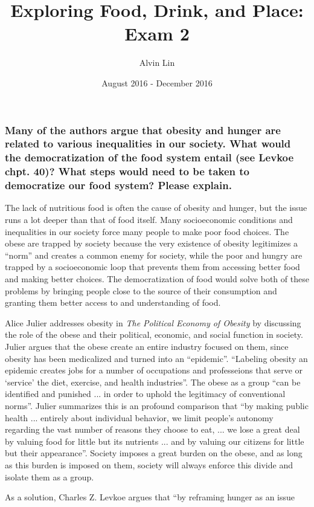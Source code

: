 \documentclass[letterpaper, 12pt]{article}
\title{Exploring Food, Drink, and Place: Exam 2}
\author{Alvin Lin}
\date{August 2016 - December 2016}
\begin{document}
\maketitle

\subsubsection*{Many of the authors argue that obesity and hunger are related
to various inequalities in our society. What would the democratization of the
food system entail (see Levkoe chpt. 40)? What steps would need to be taken to
democratize our food system? Please explain.}
The lack of nutritious food is often the cause of obesity and hunger, but the
issue runs a lot deeper than that of food itself. Many socioeconomic conditions
and inequalities in our society force many people to make poor food choices.
The obese are trapped by society because the very existence of obesity
legitimizes a ``norm'' and creates a common enemy for society, while the poor
and hungry are trapped by a socioeconomic loop that prevents them from
accessing better food and making better choices. The democratization of food
would solve both of these problems by bringing people close to the source of
their consumption and granting them better access to and understanding of
food.\par
Alice Julier addresses obesity in \textit{The Political Economy of Obesity}
by discussing the role of the obese and their political, economic, and social
function in society. Julier argues that the obese create an entire industry
focused on them, since obesity has been medicalized and turned into an
``epidemic''. ``Labeling obesity an epidemic creates jobs for a number of
occupations and professeions that serve or `service' the diet, exercise, and
health industries''. The obese as a group ``can be identified and punished ...
in order to uphold the legitimacy of conventional norms''. Julier summarizes
this is an profound comparison that ``by making public health ... entirely about
individual behavior, we limit people's autonomy regarding the vast number of
reasons they choose to eat, ... we lose a great deal by valuing food for little
but its nutrients ... and by valuing our citizens for little but their
appearance''. Society imposes a great burden on the obese, and as long
as this burden is imposed on them, society will always enforce this divide and
isolate them as a group. \par
As a solution, Charles Z. Levkoe argues that ``by reframing hunger as an issue
\end{document}
